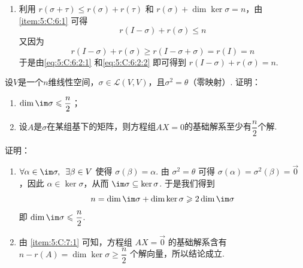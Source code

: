 \begin{exercise}
\begin{exgroup}
\begin{answer}
\begin{enumerate}
                \item 利用 $ r(\sigma + \tau) \leqslant r(\sigma) + r(\tau) $ 和 $ r(\sigma) + \dim \ker \sigma = n $，由 \ref*{item:5:C:6:1} 可得
                      \begin{equation} \label{eq:5:C:6:2:1}
                          r(I - \sigma) + r(\sigma) \leqslant n
                      \end{equation}
                      又因为
                      \begin{equation} \label{eq:5:C:6:2:2}
                          r(I - \sigma) + r(\sigma) \geqslant r(I - \sigma + \sigma) = r(I) = n
                      \end{equation}
                      于是由\autoref{eq:5:C:6:2:1} 和\autoref{eq:5:C:6:2:2} 即可得到 $ r(I - \sigma) + r(\sigma) = n $.
            \end{enumerate}
        \end{answer}


        \item 设$V$是一个$n$维线性空间，$\sigma\in \mathcal{L}(V,V)$，且$\sigma^2=\theta$（零映射）. 证明：
        \begin{enumerate}
            \item $ \dim \im \sigma \leqslant \dfrac{n}{2} $；

            \item 设$A$是$\sigma$在某组基下的矩阵，则方程组$AX=0$的基础解系至少有$\dfrac{n}{2}$个解.
        \end{enumerate}
        \begin{answer}
            证明：\begin{enumerate}
                \item \label{item:5:C:7:1}
                      $ \forall \alpha \in \im \sigma,\enspace \exists \beta \in V $ 使得 $ \sigma(\beta) = \alpha $. 由 $ \sigma^2 = \theta $ 可得 $ \sigma(\alpha) = \sigma^2(\beta) = \vec{0} $，因此 $ \alpha \in \ker \sigma $，从而 $ \im \sigma \subseteq \ker \sigma $. 于是我们得到
                      \[ n = \dim \im \sigma + \dim \ker \sigma \geqslant 2 \dim \im \sigma \]
                      即 $ \dim \im \sigma \leqslant \dfrac{n}{2} $.

                \item 由 \ref*{item:5:C:7:1} 可知，方程组 $ AX = \vec{0} $ 的基础解系含有 $ n - r(A) = \dim \ker \sigma \geqslant \dfrac{n}{2} $ 个解向量，所以结论成立.
            \end{enumerate}

        \end{answer}
    \end{exgroup}
\end{exercise}
